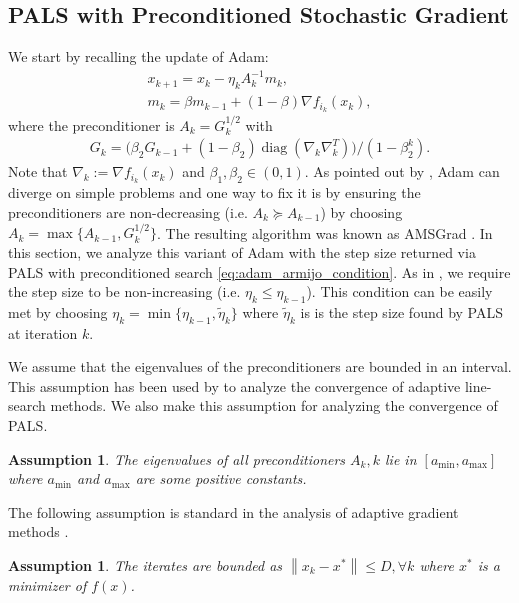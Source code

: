 \documentclass{article}
\newtheorem{lemma}[theorem]{Lemma}
\newtheorem{assumption}[theorem]{Assumption}
\newcommand{\norm}[1]{\left \lVert #1 \right \rVert}
\DeclareMathOperator{\diag}{diag}
\begin{document}
\subsection{PALS with Preconditioned Stochastic Gradient} \label{sec:adam_pals}
We start by recalling the update of Adam: 
\begin{align*}
    x_{k+1} = x_k - \eta_k A_{k}^{-1} m_k, \\
    m_k = \beta m_{k-1} + (1 - \beta) \nabla f_{i_k}(x_k),
\end{align*}
where the preconditioner is $A_k = G^{1/2}_k$ with 
\begin{align*}
    G_k = \bigl( \beta_2 G_{k-1} + (1 - \beta_2) \diag(\nabla_k \nabla_k^T) \bigr) / (1 - \beta_2^k).
\end{align*}
Note that $\nabla_k := \nabla f_{i_k}(x_k)$ and $\beta_1, \beta_2 \in (0,1)$. As pointed out by \citet{reddi2019convergence}, Adam can diverge on simple problems and one way to fix it is by ensuring the preconditioners are non-decreasing (i.e. $A_{k} \succeq A_{k-1} $) by choosing $A_k = \max\{ A_{k-1}, G^{1/2}_{k}\}$. The resulting algorithm was known as AMSGrad \citep{reddi2019convergence}. In this section, we analyze this variant of Adam with the step size returned via PALS with preconditioned search \eqref{eq:adam_armijo_condition}. As in \citet{vaswani2020adaptive}, we require the step size to be non-increasing (i.e. $\eta_k \leq \eta_{k-1}$). This condition can be easily met by choosing $\eta_k = \min \{ \eta_{k-1}, \tilde{\eta}_k\}$ where $\tilde{\eta}_k$ is is the step size found by PALS at iteration $k$. 

We assume that the eigenvalues of the preconditioners are bounded in  an interval. This assumption has been used by \citet{vaswani2020adaptive} to analyze the convergence of adaptive line-search methods. We also make this assumption for analyzing the convergence of PALS.
\begin{assumption} \label{ass:eigen_bound}
    The eigenvalues of all preconditioners $A_k, k$ lie in $[a_{\min}, a_{\max}]$ where $a_{\min}$ and $a_{\max}$ are some positive constants.  
\end{assumption}

The following assumption is standard in the analysis of adaptive gradient methods \citep{duchi2011adaptive,levy2018online,reddi2019convergence}.
\begin{assumption} \label{ass:bounded_domain}
    The iterates are bounded as $\norm{x_k - x^*} \leq D, \forall k$ where $x^*$ is a minimizer of $f(x)$.  
\end{assumption}
\end{document}

